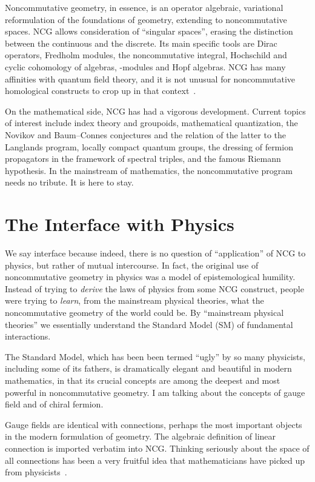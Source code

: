 \documentclass[a4paper,12pt]{article}
\providecommand{\1}{\mathbf{1}}         %
\providecommand{\7}{\dagger}            %
\providecommand{\8}{\bullet}            %
\renewcommand{\.}{\cdot}            %
\renewcommand{\:}{\colon}           %
\begin{document}
\smallskip

Noncommutative geometry, in essence, is an operator algebraic,
variational reformulation of the foundations of geometry, extending to
noncommutative spaces. NCG allows consideration of ``singular
spaces'', erasing the distinction between the continuous and the
discrete. Its main specific tools are Dirac operators, Fredholm
modules, the noncommutative integral, Hochschild and cyclic cohomology
of algebras, \coordHE{}-modules and Hopf algebras. NCG has many affinities 
with quantum field theory, and it is not unusual for noncommutative 
homological constructs to crop up in that context~\cite{Halley}.

On the mathematical side, NCG has had a vigorous development. Current
topics of interest include index theory and groupoids, mathematical
quantization, the Novikov and Baum--Connes conjectures and the
relation of the latter to the Langlands program, locally compact
quantum groups, the dressing of fermion
propagators in the framework of spectral triples, and the famous
Riemann hypothesis. In the mainstream of mathematics, the
noncommutative program needs no tribute. It is here to stay.



\section{The Interface with Physics}

We say interface because indeed, there is no question of
``application'' of NCG to physics, but rather of mutual intercourse.
In fact, the original use of noncommutative geometry in physics was a
model of epistemological humility. Instead of trying to
{\it derive\/} the laws of physics from some NCG construct, people
were trying to {\it learn}, from the mainstream physical theories,
what the noncommutative geometry of the world could be. By
``mainstream physical theories'' we essentially understand the
Standard Model (SM) of fundamental interactions.

The Standard Model, which has been been termed ``ugly'' by so many
physicists, including some of its fathers, is dramatically elegant and
beautiful in modern mathematics, in that its crucial concepts are
among the deepest and most powerful in noncommutative geometry. I am
talking about the concepts of gauge field and of chiral fermion.

Gauge fields are identical with connections, perhaps the most
important objects in the modern formulation of geometry. The algebraic
definition of linear connection is imported verbatim into NCG. Thinking
seriously about the space of all connections has been a very fruitful
idea that mathematicians have picked up from physicists~\cite{Woit}.
\end{document}
